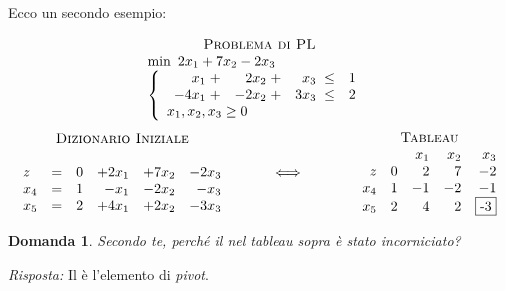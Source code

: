 \documentclass[10pt]{article}
\newtheorem{Dom}{Domanda}%
\begin{document}
Ecco un secondo esempio:

\[
   \begin{array}{c}
   \mbox{\sc Problema di PL}\\ 
   \begin{array}{l}
        \min \mbox{\ }2x_1 + 7x_2 -2x_3\\
        \left\{
        \begin{array}{l}
        \begin{array}{rrrr}
             x_1 \;+&  2x_2 \;+&  x_3 \;\leq &   1 \\
           -4x_1 \;+& -2x_2 \;+& 3x_3 \;\leq &   2 \\
        \end{array} \\
        x_1, x_2, x_3  \geq 0    
        \end{array}
        \right.
   \end{array}
   \end{array}
\]
\[
   \begin{array}{c}
   \mbox{\sc Dizionario Iniziale}\\ \\
   \begin{array}{lcrrrr}
         z    &=& 0 & +2x_1 & +7x_2 & -2x_3 \\   
      x_{4} &=& 1 & -x_1 & -2x_2 & -x_3 \\
      x_{5} &=& 2 & +4x_1 & +2x_2 & -3x_3 \\
   \end{array}
   \end{array}
\hfill
\hspace{1cm}
{\Huge \Longleftrightarrow}
\hfill
\hspace{1.2cm}
   \begin{array}{c}
   \mbox{\sc Tableau}\\ 
   \begin{array}{rrrrr}
         &	& x_1  & x_2 & x_3  \\
       z  & 0 & 2 &  7   &  -2 \\         
      x_4 &  1 &  -1 &  -2   &  -1 \\
      x_5 & 2 & 4 & 2 &  \fbox{-3} \\
   \end{array}
   \end{array}
\]

\begin{Dom}
   Secondo te,
   perch\'e il  nel tableau sopra \`e stato incorniciato?
\end{Dom}
{\em Risposta: \/}
Il  \`e l'elemento di {\em pivot}.\\
\end{document}
